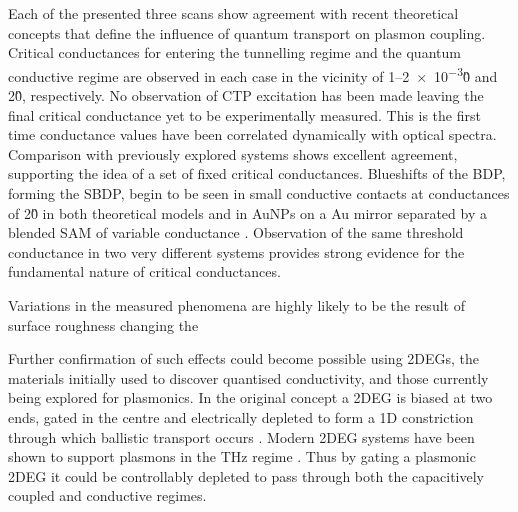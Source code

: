 \documentclass[a4paper]{article}
\begin{document}
Each of the presented three scans show agreement with recent theoretical concepts that define the influence of quantum transport on plasmon coupling. Critical conductances for entering the tunnelling regime and the quantum conductive regime are observed in each case in the vicinity of 1--\num{2e-3}\G0 and 2\G0, respectively. No observation of CTP excitation has been made leaving the final critical conductance yet to be experimentally measured. This is the first time conductance values have been correlated dynamically with optical spectra. Comparison with previously explored systems shows excellent agreement, supporting the idea of a set of fixed critical conductances. Blueshifts of the BDP, forming the SBDP, begin to be seen in small conductive contacts at conductances of 2\G0 in both theoretical models \cite{perez2010, perez2011} and in AuNPs on a Au mirror separated by a blended SAM of variable conductance \cite{benz2014}. Observation of the same threshold conductance in two very different systems provides strong evidence for the fundamental nature of critical conductances.

Variations in the measured phenomena are highly likely to be the result of surface roughness changing the

Further confirmation of such effects could become possible using 2DEGs, the materials initially used to discover quantised conductivity, and those currently being explored for plasmonics. In the original concept a 2DEG is biased at two ends, gated in the centre and electrically depleted to form a 1D constriction through which ballistic transport occurs \cite{van1988quantized, wharam1988one}. Modern 2DEG systems have been shown to support plasmons in the THz regime \cite{}. Thus by gating a plasmonic 2DEG it could be controllably depleted to pass through both the capacitively coupled and conductive regimes. 



\end{document}
